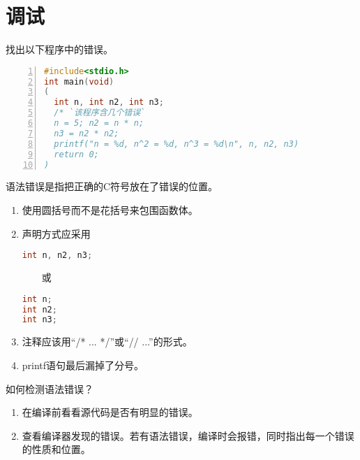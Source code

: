 \section{调试}
\begin{frame}[fragile]
找出以下程序中的错误。
\begin{lstlisting}[language=c,numbers=left,frame=tb]
#include<stdio.h>
int main(void) 
(
  int n, int n2, int n3;
  /* `该程序含几个错误`    
  n = 5; n2 = n * n;
  n3 = n2 * n2;
  printf("n = %d, n^2 = %d, n^3 = %d\n", n, n2, n3)	 
  return 0;
)
\end{lstlisting}
\end{frame}

\begin{frame}[fragile]
\begin{dingyi} 
\textcolor{acolor3}{语法错误}是指把正确的C符号放在了错误的位置。
\end{dingyi}\pause 

\begin{enumerate}
\item 使用圆括号而不是花括号来包围函数体。\\[0.1in]
\item 声明方式应采用

\begin{minipage}{0.4\linewidth}
\begin{lstlisting}[language=c,frame=single]
int n, n2, n3;
\end{lstlisting}
\end{minipage}
~~~~或~~~~
\begin{minipage}{0.4\linewidth}
\begin{lstlisting}[language=c,frame=single]
int n;
int n2;
int n3;
\end{lstlisting}
\end{minipage}
\item 注释应该用“{\tf /* ... */}”或“{\tf // ...}”的形式。\\[0.1in]
\item printf语句最后漏掉了分号。
\end{enumerate}
\end{frame}

\begin{frame}[fragile]
\begin{wenti}
如何检测语法错误？
\end{wenti}\pause 

\begin{enumerate}
\item 在编译前看看源代码是否有明显的错误。\\[0.1in]
\item 查看编译器发现的错误。若有语法错误，编译时会报错，同时指出每一个错误的性质和位置。
\end{enumerate}

\end{frame}


